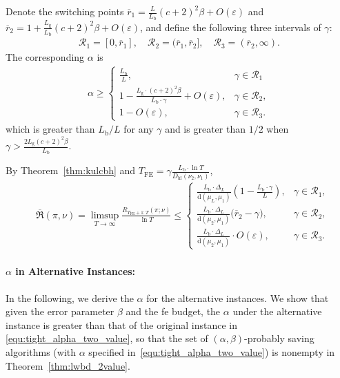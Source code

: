 \documentclass[twoside,11pt]{article}
\newcommand{\kl}{D_{\mathrm{kl}}}
\newcommand{\calR}{\mathcal{R}}
\newcommand{\rmb}{\mathrm{b}}
\newcommand{\rmd}{\mathrm{d}}
\newcommand{\rmg}{\mathrm{g}}
\newcommand{\Tfe}{T_{\mathrm{FE}}}
\begin{document}
Denote the switching points $\overline{r}_1 = \frac{L}{L_{\rmb}} (c+2)^2\beta + O(\varepsilon)$ and $\overline{r}_2 = 1 +  \frac{L_{\rmg}}{L_{\rmb}} (c+2)^2\beta+O(\varepsilon)$, and define the following three intervals of $\gamma$:  
\begin{align}
         \mathcal{R}_1   = [0,\overline{r}_1] ,\quad\mathcal{R}_2 = (\overline{r}_1, \overline{r}_2], \quad\mathcal{R}_3= (\overline{r}_2,\infty).
\end{align}
The corresponding $\alpha$ is 
\begin{align}\label{equ:tight_alpha_two_value}
    \alpha \geq
    \begin{cases}
        \frac{L_{\rmb}}{L}, &\gamma \in\calR_1
        \\
        1-\frac{L_{\rmg}\cdot (c+2)^2\beta}{L_{\rmb}\cdot\gamma}+O(\varepsilon) ,&
             \gamma \in\calR_2,
        \\
        1- O(\varepsilon) , & \gamma \in\calR_3.
    \end{cases}
\end{align}
which is greater than $L_{\rmb}/L$ for any $\gamma$ and is greater than $1/2$ when $\gamma>\frac{2L_{\rmg}(c+2)^2\beta}{L_{\rmb}}$.


By Theorem~\ref{thm:kulcbh} and $\Tfe =\gamma \frac{L_{\rmb}\cdot \ln T}{\kl(\nu_2,\nu_1)}$, 
\begin{align}\label{equ:tight_up_two_value}
    & \overline{\mathfrak{R}}(\pi,\nu)=\limsup_{T\to\infty}  \frac{R_{\Tfe+1:T} (\pi;\nu )}{\ln T}
    \leq   
    \begin{cases}
        \frac{L_{\rmb}\cdot\Delta_{L}}{\rmd(\mu_L,\mu_1)}(1-\frac{L_{\rmb}\cdot\gamma}{L}), &\gamma \in\calR_1,  
        \\
        \frac{L_{\rmb}\cdot \Delta_{L}}{\rmd(\mu_2,\mu_1)}\big( \overline{r}_2-\gamma\big)  ,&
             \gamma \in\calR_2,
        \\
        \frac{L_{\rmb}\cdot \Delta_{L}}{\rmd(\mu_2,\mu_1)}\cdot O(\varepsilon), & \gamma \in\calR_3.
    \end{cases}
\end{align}

\paragraph{$\alpha$ in Alternative Instances:}

In the following, we derive the $\alpha$ for the alternative instances. We show that given the error parameter $\beta$ and the \ac{fe} budget, the $\alpha$ under the alternative instance is greater than that of the original instance in \eqref{equ:tight_alpha_two_value}, so that the set of $(\alpha,\beta)$-probably saving algorithms (with $\alpha$ specified in~\eqref{equ:tight_alpha_two_value}) is nonempty in Theorem~\ref{thm:lwbd_2value}.
\end{document}
